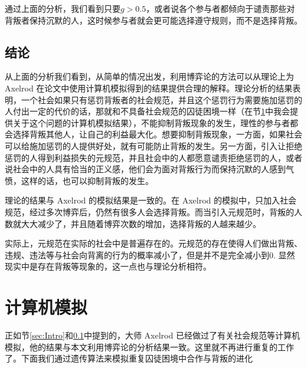 \documentclass[lang=cn,11pt]{elegantpaper}
\begin{document}
通过上面的分析，我们看到只要$g>0.5$，或者说各个参与者都倾向于谴责那些对背叛者保持沉默的人，这时候参与者就会更可能选择遵守规则，而不是选择背叛。

\subsection{结论}\label{sec:Conclution}
从上面的分析我们看到，从简单的情况出发，利用博弈论的方法可以从理论上为 Axelrod 在论文\cite{Axelrod1986}中使用计算机模拟得到的结果提供合理的解释。理论分析的结果表明，一个社会如果只有惩罚背叛者的社会规范，并且这个惩罚行为需要施加惩罚的人付出一定的代价的话，那就和不具备社会规范的囚徒困境一样（在节\ref{sec:Prisoner}中我会提供关于这个问题的计算机模拟结果），不能抑制背叛现象的发生，理性的参与者都会选择背叛其他人，让自己的利益最大化。想要抑制背叛现象，一方面，如果社会可以给施加惩罚的人提供好处，就有可能防止背叛的发生。另一方面，引入让拒绝惩罚的人得到利益损失的元规范，并且社会中的人都愿意谴责拒绝惩罚的人，或者说社会中的人具有恰当的正义感，他们会为面对背叛行为而保持沉默的人感到气愤，这样的话，也可以抑制背叛的发生。

理论的结果与 Axelrod 的模拟结果\cite{Axelrod1986}是一致的。在 Axelrod 的模拟中，只加入社会规范，经过多次博弈后，仍然有很多人会选择背叛。而当引入元规范时，背叛的人数就大大减少了，并且随着博弈次数的增加，选择背叛的人越来越少。

实际上，元规范在实际的社会中是普遍存在的。元规范的存在使得人们做出背叛、违规、违法等与社会向背离的行为的概率减小了，但是并不是完全减小到0. 显然现实中是存在背叛等现象的，这一点也与理论分析相符。

\section{计算机模拟}\label{sec:Prisoner}
正如节\ref{sec:Intro}和\ref{sec:Conclution}中提到的，大师 Axelrod 已经做过了有关社会规范等计算机模拟\cite{Axelrod1986}\cite{axelrod1981evolution}，他的结果与本文利用博弈论的分析结果一致。这里就不再进行重复的工作了。下面我们通过遗传算法来模拟重复囚徒困境中合作与背叛的进化
\end{document}
